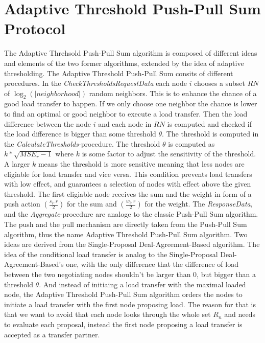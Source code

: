 \section{Adaptive Threshold Push-Pull Sum Protocol}\label{sec:adaptivethresholdPPS}
The Adaptive Threhsold Push-Pull Sum algorithm is composed of different ideas and elements of the two former algorithms, extended by the idea of adaptive thresholding. The Adaptive Threshold Push-Pull Sum consits of different procedures. In the \textit{CheckThresholdsRequestData} each node $i$ chooses a subset $RN$ of $\log_{2}{(|neighborhood|)}$ random neighbors. This is to enhance the chance of a good load transfer to happen. If we only choose one neighbor the chance is lower to find an optimal or good neighbor to execute a load transfer. Then the load difference between the node $i$ and each node in $RN$ is computed and checked if the load difference is bigger than some threshold $\theta$. The threshold is computed in the \textit{CalculateThresholds}-procedure. The threshold $\theta$ is computed as $k*\sqrt{MSE_r-1}$ where $k$ is some factor to adjust the sensitivity of the threshold. A larger $k$ means the threshold is more sensitive meaning that less nodes are eligiable for load transfer and vice versa. This condition prevents load transfers with low effect, and guarantees a selection of nodes with effect above the given threshold. The first eligiable node receives the sum and the weight in form of a push action $(\frac{s_i,r}{2})$ for the sum and $(\frac{w_i,r}{2})$ for the weight. The \textit{ResponseData}, and the \textit{Aggregate}-procedure are analoge to the classic Push-Pull Sum algorithm. The push and the pull mechanism are directly taken from the Push-Pull Sum algorithm, thus the name Adaptive Threshold Push-Pull Sum algorithm. Two ideas are derived from the Single-Proposal Deal-Agreement-Based algorithm. The idea of the conditional load transfer is analog to the Single-Proposal Deal-Agreement-Based's one, with the only difference that the difference of load between the two negotiating nodes shouldn't be larger than $0$, but bigger than a threshold $\theta$. And instead of initiaing a load transfer with the maximal loaded node, the Adaptive Threshold Push-Pull Sum algorithm orders the nodes to initiate a load transfer with the first node proposing load. The reason for that is that we want to avoid that each node looks through the whole set $R_n$ and needs to evaluate each proposal, instead the first node proposing a load transfer is accepted as a transfer partner.

